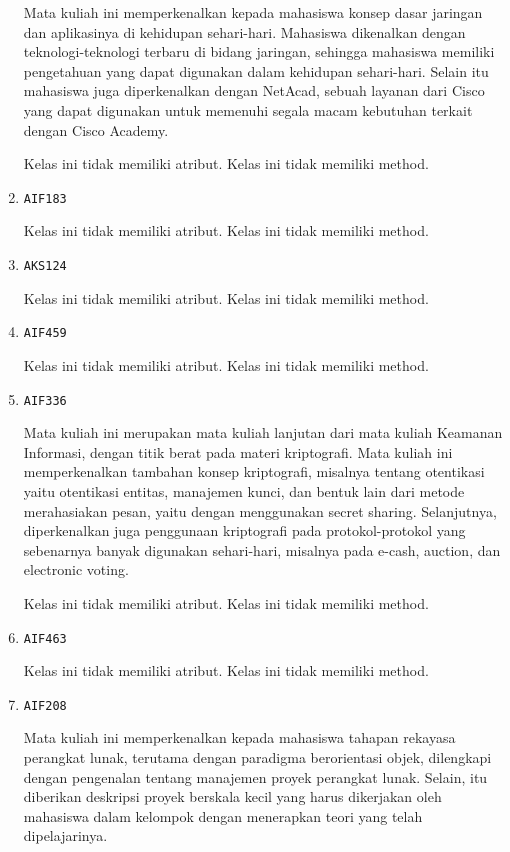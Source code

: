 \documentclass{article}
\begin{document}
\begin{enumerate}
Mata kuliah ini memperkenalkan kepada mahasiswa konsep dasar 
 jaringan dan aplikasinya di kehidupan sehari-hari. Mahasiswa 
 dikenalkan dengan teknologi-teknologi terbaru di bidang jaringan, 
 sehingga mahasiswa memiliki pengetahuan yang dapat digunakan 
 dalam kehidupan sehari-hari. Selain itu mahasiswa juga 
 diperkenalkan dengan NetAcad, sebuah layanan dari Cisco yang 
 dapat digunakan untuk memenuhi segala macam kebutuhan terkait 
 dengan Cisco Academy.

Kelas ini tidak memiliki atribut. Kelas ini tidak memiliki method. \item \texttt{AIF183}



Kelas ini tidak memiliki atribut. Kelas ini tidak memiliki method. \item \texttt{AKS124}



Kelas ini tidak memiliki atribut. Kelas ini tidak memiliki method. \item \texttt{AIF459}



Kelas ini tidak memiliki atribut. Kelas ini tidak memiliki method. \item \texttt{AIF336}

Mata kuliah ini merupakan mata kuliah lanjutan dari mata kuliah Keamanan 
 Informasi, dengan titik berat pada materi kriptografi. Mata kuliah ini 
 memperkenalkan tambahan konsep kriptografi, misalnya tentang otentikasi 
 yaitu otentikasi entitas, manajemen kunci, dan bentuk lain dari metode 
 merahasiakan pesan, yaitu dengan menggunakan secret sharing. Selanjutnya, 
 diperkenalkan juga penggunaan kriptografi pada protokol-protokol yang 
 sebenarnya banyak digunakan sehari-hari, misalnya pada e-cash, auction, 
 dan electronic voting.

Kelas ini tidak memiliki atribut. Kelas ini tidak memiliki method. \item \texttt{AIF463}



Kelas ini tidak memiliki atribut. Kelas ini tidak memiliki method. \item \texttt{AIF208}

Mata kuliah ini memperkenalkan kepada mahasiswa tahapan rekayasa perangkat 
 lunak, terutama dengan paradigma berorientasi objek, dilengkapi dengan 
 pengenalan tentang manajemen proyek perangkat lunak.
 Selain, itu diberikan deskripsi proyek berskala kecil yang harus dikerjakan 
 oleh mahasiswa dalam kelompok dengan menerapkan teori yang telah 
 dipelajarinya.


\end{enumerate}
\end{document}
